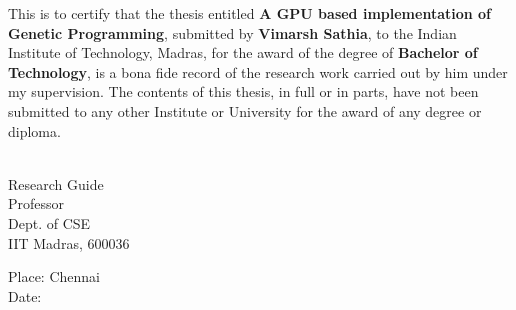 \certificate

\vspace*{0.5in}

\noindent This is to certify that the thesis entitled {\bf A GPU based implementation of Genetic Programming}, 
submitted by {\bf Vimarsh Sathia}, to the Indian Institute of Technology, 
Madras, for the award of the degree of {\bf Bachelor of Technology}, 
is a bona fide record of the research work carried out by him under my
supervision. The contents of this thesis, in full or in parts, have not been
submitted to any other Institute or University for the award of any degree or
diploma.

\vspace*{1.4in}
\hspace*{-0.25in}
\begin{singlespacing}
	\hspace*{-0.25in}
	\parbox{2.5in}{
		 \\
		\noindent Research Guide \\ 
		\noindent Professor \\
		\noindent Dept. of CSE\\
		\noindent IIT Madras, 600036 \\
	} 
	\hspace*{1.0in} 
\end{singlespacing}
\vspace*{0.25in}
\noindent Place: Chennai\\
Date: 
